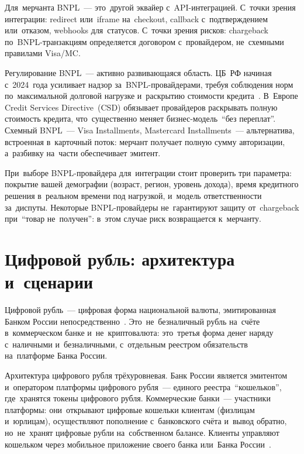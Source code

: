 Для~мерчанта BNPL~--- это~другой эквайер с~API-интеграцией. С~точки
зрения интеграции: redirect или~iframe на~checkout, callback с~подтверждением
или~отказом, webhooks для~статусов. С~точки зрения рисков: chargeback
по~BNPL-транзакциям определяется договором с~провайдером, не~схемными
правилами Visa/MC.

Регулирование BNPL~--- активно развивающаяся область. ЦБ~РФ начиная
с~2024~года усиливает надзор за~BNPL-провайдерами, требуя соблюдения
норм по~максимальной долговой нагрузке и~раскрытию стоимости
кредита~.
В~Европе Credit Services Directive~(CSD) обязывает провайдеров раскрывать
полную стоимость кредита, что~существенно меняет бизнес-модель~\enquote{без
  переплат}. Схемный BNPL~--- Visa Installments, Mastercard Installments~---
альтернатива, встроенная в~карточный поток: мерчант получает полную
сумму авторизации, а~разбивку на~части обеспечивает эмитент.

\begin{practice}
  При~выборе BNPL-провайдера для~интеграции стоит проверить три параметра:
  покрытие вашей демографии (возраст, регион, уровень дохода), время
  кредитного решения в~реальном времени под нагрузкой, и~модель
  ответственности за~диспуты. Некоторые BNPL-провайдеры не~гарантируют
  защиту от~chargeback при~\enquote{товар не~получен}: в~этом случае
  риск возвращается к~мерчанту.
\end{practice}


\section{Цифровой рубль: архитектура и~сценарии}
\label{sec:alt-digital-ruble}

Цифровой рубль~--- цифровая форма национальной валюты, эмитированная
Банком России непосредственно~.
Это~не~безналичный рубль на~счёте в~коммерческом банке и~не~криптовалюта:
это~третья форма денег наряду с~наличными и~безналичными, с~отдельным
реестром обязательств на~платформе Банка России.

Архитектура цифрового рубля трёхуровневая. Банк России является эмитентом и~оператором
платформы цифрового рубля~--- единого реестра~\enquote{кошельков},
где~хранятся токены цифрового рубля. Коммерческие банки~--- участники
платформы: они~открывают цифровые кошельки клиентам (физлицам и~юрлицам),
осуществляют пополнение с~банковского счёта и~вывод обратно, но~не~хранят
цифровые рубли на~собственном балансе. Клиенты управляют кошельком
через мобильное приложение своего банка или~Банка России~.


